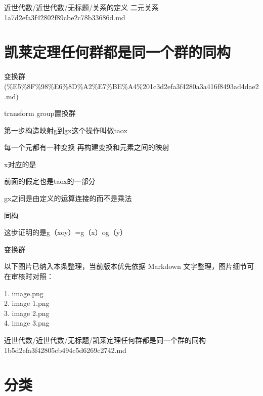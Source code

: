 \begin{note}[来源路径]

近世代数/近世代数/无标题/关系的定义 二元关系 1a7d2efa3f42802f89cbe2c78b33686d.md

\end{note}

\section*{凯莱定理任何群都是同一个群的同构}

\begin{note}[来源上级主题]

变换群 (\%E5\%8F\%98\%E6\%8D\%A2\%E7\%BE\%A4\%201c3d2efa3f4280a3a416f8493ad4dae2.md)

\end{note}

\begin{theorem}[凯莱定理任何群都是同一个群的同构]

transform group置换群

第一步构造映射g到gx这个操作叫做taox

每一个元都有一种变换 再构建变换和元素之间的映射

x对应的是

前面的假定也是taox的一部分

gx之间是由定义的运算连接的而不是乘法

同构

这步证明的是g（xoy）=g（x）og（y）

变换群

\end{theorem}

\begin{note}[关联图片]
以下图片已纳入本条整理，当前版本优先依据 Markdown 文字整理，图片细节可在审核时对照：

1. image.png\\
2. image 1.png\\
3. image 2.png\\
4. image 3.png\\

\end{note}

\begin{note}[来源路径]

近世代数/近世代数/无标题/凯莱定理任何群都是同一个群的同构 1b5d2efa3f42805cb494c5d6269c2742.md

\end{note}

\section*{分类}

